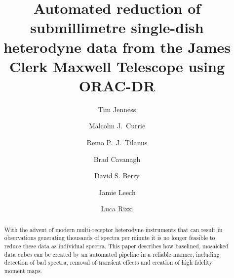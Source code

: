 \documentclass[final,authoryear,5p,times,twocolumn]{elsarticle}
\begin{document}
\begin{frontmatter}



\title{Automated reduction of submillimetre single-dish heterodyne
  data from the James Clerk Maxwell Telescope using ORAC-DR}


\author[jac,cornell]{Tim Jenness}
\author[jac]{Malcolm J.\ Currie}
\author[jac]{Remo P.\ J.\ Tilanus}
\author[jac]{Brad Cavanagh}
\author[jac]{David S. Berry}
\author[jac]{Jamie Leech}
\author[jac]{Luca Rizzi}


\address[jac]{Joint Astronomy Centre, 660 N.\ A`oh\=ok\=u Place, Hilo, HI
  96720, USA}
\address[cornell]{Department of Astronomy, Cornell University, Ithaca,
  NY 14853, USA}

\begin{abstract}

With the advent of modern multi-receptor heterodyne instruments that
can result in observations generating thousands of spectra per minute it is
no longer feasible to reduce these data as individual spectra. This
paper describes how baselined, mosaicked data cubes can be created by
an automated pipeline in a reliable manner, including detection of bad
spectra, removal of transient effects and creation of high fidelity
moment maps.


\end{abstract}
\end{frontmatter}
\end{document}
